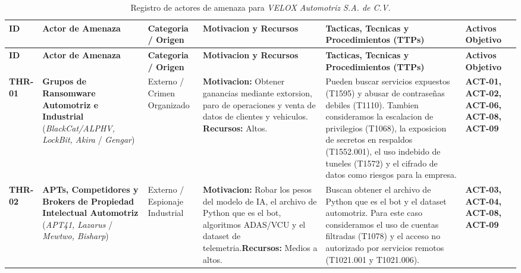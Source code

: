 \documentclass[letterpaper,11pt]{article}
\begin{document}
\vspace{0.2cm}
\begingroup
\scriptsize
\setlength{\tabcolsep}{4pt}
\renewcommand{\arraystretch}{1.28}
\noindent
\begin{longtable}{|C{1.3cm}|L{2.9cm}|L{2.2cm}|L{2.8cm}|L{4.95cm}|C{2.0cm}|}
\caption{Registro de actores de amenaza para \textit{VELOX Automotriz S.A. de C.V.}}
\label{tab:actores-amenaza} \\
\hline
{}
\textbf{ID}
  & \textbf{Actor de Amenaza}
  & \textbf{Categoria / Origen}
  & \textbf{Motivacion y Recursos}
  & \textbf{Tacticas, Tecnicas y Procedimientos (TTPs)}
  & \textbf{Activos Objetivo} \\
\hline
\endfirsthead
\hline
{}
\textbf{ID}
  & \textbf{Actor de Amenaza}
  & \textbf{Categoria / Origen}
  & \textbf{Motivacion y Recursos}
  & \textbf{Tacticas, Tecnicas y Procedimientos (TTPs)}
  & \textbf{Activos Objetivo} \\
\hline
\endhead
\hline
\endlastfoot

\textbf{THR-01}
  & \textbf{Grupos de Ransomware Automotriz e Industrial}
(\textit{BlackCat/ALPHV, LockBit, Akira} / \textit{Gengar})
  & Externo / Crimen Organizado
  & \textbf{Motivacion:} Obtener ganancias mediante extorsion, paro de
operaciones y venta de datos de clientes y vehiculos.\newline
\textbf{Recursos:} Altos.
  & Pueden buscar servicios expuestos (T1595) y abusar de contraseñas
debiles (T1110). Tambien consideramos la escalacion de privilegios
(T1068), la exposicion de secretos en respaldos (T1552.001), el uso
indebido de tuneles (T1572) y el cifrado de datos como riesgos para
la empresa.
  & \textbf{ACT-01, ACT-02, ACT-06, ACT-08, ACT-09} \\
\hline

\textbf{THR-02}
  & \textbf{APTs, Competidores y Brokers de Propiedad Intelectual
Automotriz} (\textit{APT41, Lazarus} / \textit{Mewtwo, Bisharp})
  & Externo / Espionaje Industrial
  & \textbf{Motivacion:} Robar los pesos del modelo de IA, el archivo de
Python que es el bot, algoritmos ADAS/VCU y el dataset de
telemetria.\newline \textbf{Recursos:} Medios a altos.
  & Buscan obtener el archivo de Python que es el bot y el dataset
automotriz. Para este caso consideramos el uso de cuentas filtradas
(T1078) y el acceso no autorizado por servicios remotos (T1021.001
y T1021.006).
  & \textbf{ACT-03, ACT-04, ACT-08, ACT-09} \\
\hline


\end{longtable}
\end{document}
